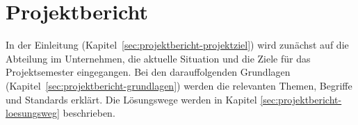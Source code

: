 
\chapter{Projektbericht} \label{ch:projektbericht}

In der Einleitung (Kapitel\ \ref{sec:projektbericht-projektziel}) wird zunächst auf die Abteilung im Unternehmen, die aktuelle Situation und die Ziele für das Projektsemester eingegangen.
Bei den darauffolgenden Grundlagen (Kapitel\ \ref{sec:projektbericht-grundlagen}) werden die relevanten Themen, Begriffe und Standards erklärt.
Die Lösungswege werden in Kapitel \ref{sec:projektbericht-loesungsweg} beschrieben.





